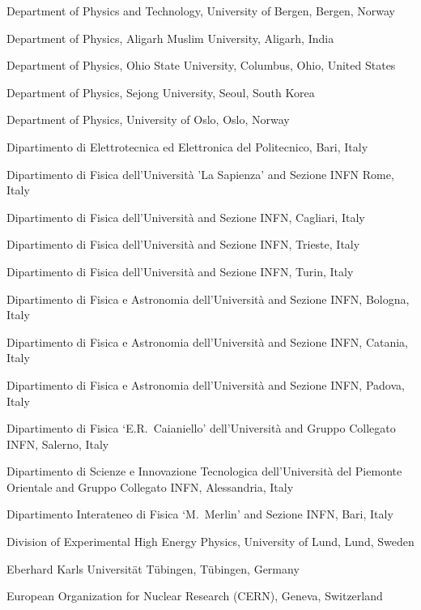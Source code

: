 \begin{flushleft}
\begin{Authlist}
\item {}Department of Physics and Technology, University of Bergen, Bergen, Norway
\item {}Department of Physics, Aligarh Muslim University, Aligarh, India
\item {}Department of Physics, Ohio State University, Columbus, Ohio, United States
\item {}Department of Physics, Sejong University, Seoul, South Korea
\item {}Department of Physics, University of Oslo, Oslo, Norway
\item {}Dipartimento di Elettrotecnica ed Elettronica del Politecnico, Bari, Italy
\item {}Dipartimento di Fisica dell'Universit\`{a} 'La Sapienza' and Sezione INFN Rome, Italy
\item {}Dipartimento di Fisica dell'Universit\`{a} and Sezione INFN, Cagliari, Italy
\item {}Dipartimento di Fisica dell'Universit\`{a} and Sezione INFN, Trieste, Italy
\item {}Dipartimento di Fisica dell'Universit\`{a} and Sezione INFN, Turin, Italy
\item {}Dipartimento di Fisica e Astronomia dell'Universit\`{a} and Sezione INFN, Bologna, Italy
\item {}Dipartimento di Fisica e Astronomia dell'Universit\`{a} and Sezione INFN, Catania, Italy
\item {}Dipartimento di Fisica e Astronomia dell'Universit\`{a} and Sezione INFN, Padova, Italy
\item {}Dipartimento di Fisica `E.R.~Caianiello' dell'Universit\`{a} and Gruppo Collegato INFN, Salerno, Italy
\item {}Dipartimento di Scienze e Innovazione Tecnologica dell'Universit\`{a} del  Piemonte Orientale and Gruppo Collegato INFN, Alessandria, Italy
\item {}Dipartimento Interateneo di Fisica `M.~Merlin' and Sezione INFN, Bari, Italy
\item {}Division of Experimental High Energy Physics, University of Lund, Lund, Sweden
\item {}Eberhard Karls Universit\"{a}t T\"{u}bingen, T\"{u}bingen, Germany
\item {}European Organization for Nuclear Research (CERN), Geneva, Switzerland

\end{Authlist}
\end{flushleft}
